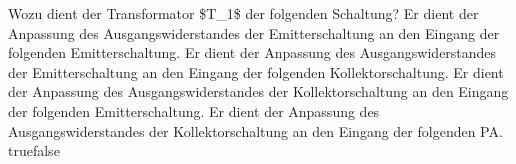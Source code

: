    {Wozu dient der Transformator \$T\_1\$ der folgenden Schaltung?}
    {Er dient der Anpassung des Ausgangswiderstandes der Emitterschaltung an den Eingang der folgenden Emitterschaltung.}
    {Er dient der Anpassung des Ausgangswiderstandes der Emitterschaltung an den Eingang der folgenden Kollektorschaltung.}
    {Er dient der Anpassung des Ausgangswiderstandes der Kollektorschaltung an den Eingang der folgenden Emitterschaltung.}
    {Er dient der Anpassung des Ausgangswiderstandes der Kollektorschaltung an den Eingang der folgenden PA.}
    {true}{false}